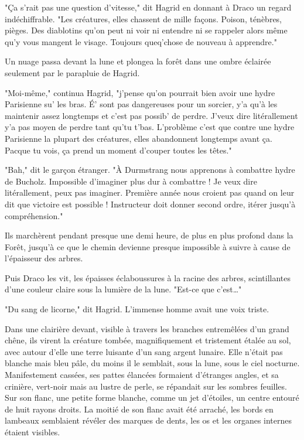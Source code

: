 "Ça s'rait pas une question d'vitesse," dit Hagrid en donnant à Draco un regard indéchiffrable. "Les créatures, elles chassent de mille façons. Poison, ténèbres, pièges. Des diablotins qu'on peut ni voir ni entendre ni se rappeler alors même qu'y vous mangent le visage. Toujours queq'chose de nouveau à apprendre."

Un nuage passa devant la lune et plongea la forêt dans une ombre éclairée seulement par le parapluie de Hagrid.

"Moi-même," continua Hagrid, "j'pense qu'on pourrait bien avoir une hydre Parisienne su' les bras. É' sont pas dangereuses pour un sorcier, y'a qu'à les maintenir assez longtemps et c'est pas possib' de perdre. J'veux dire litérallement y'a pas moyen de perdre tant qu'tu t'bas. L'problème c'est que contre une hydre Parisienne la plupart des créatures, elles abandonnent longtemps avant ça. Pacque tu vois, ça prend un moment d'couper toutes les têtes."

"Bah," dit le garçon étranger. "À Durmstrang nous apprenons à combattre hydre de Bucholz. Impossible d'imaginer plus dur à combattre ! Je veux dire litérallement, peux pas imaginer. Première année nous croient pas quand on leur dit que victoire est possible ! Instructeur doit donner second ordre, itérer jusqu'à compréhension."

Ils marchèrent pendant presque une demi heure, de plus en plus profond dans la Forêt, jusqu'à ce que le chemin devienne presque impossible à suivre à cause de l'épaisseur des arbres.

Puis Draco les vit, les épaisses éclaboussures à la racine des arbres, scintillantes d'une couleur claire sous la lumière de la lune. "Est-ce que c'est…"

"Du sang de licorne," dit Hagrid. L'immense homme avait une voix triste.

Dans une clairière devant, visible à travers les branches entremêlées d'un grand chêne, ils virent la créature tombée, magnifiquement et tristement étalée au sol, avec autour d'elle une terre luisante d'un sang argent lunaire. Elle n'était pas blanche mais bleu pâle, du moins il le semblait, sous la lune, sous le ciel nocturne. Manifestement cassées, ses pattes élancées formaient d'étranges angles, et sa crinière, vert-noir mais au lustre de perle, se répandait sur les sombres feuilles. Sur son flanc, une petite forme blanche, comme un jet d'étoiles, un centre entouré de huit rayons droits. La moitié de son flanc avait été arraché, les bords en lambeaux semblaient révéler des marques de dents, les os et les organes internes étaient visibles.

